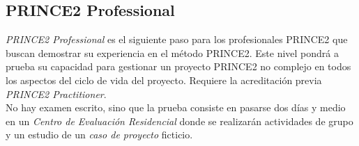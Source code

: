 \subsection{PRINCE2 Professional}
\emph{PRINCE2 Professional} es el siguiente paso para los profesionales PRINCE2 que buscan demostrar su experiencia en el método PRINCE2. Este nivel pondrá a prueba su capacidad para gestionar un proyecto PRINCE2 no complejo en todos los aspectos del ciclo de vida del proyecto. Requiere la acreditación previa \emph{PRINCE2 Practitioner}.\\

No hay examen escrito, sino que la prueba consiste en pasarse dos días y medio en un \emph{Centro de Evaluación Residencial} donde se realizarán actividades de grupo y un estudio de un \emph{caso de proyecto} ficticio.